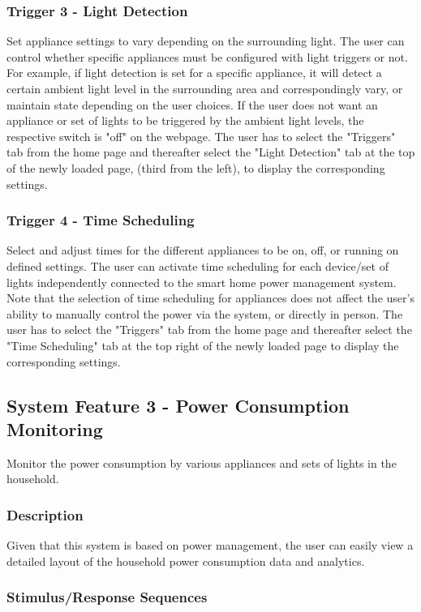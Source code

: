 \documentclass[11pt, a4paper]{article}
\newcounter{subsubsubsection}[subsubsection]
\begin{document}
	\subsubsection{Trigger 3 - Light Detection}
	Set appliance settings to vary depending on the surrounding light.
	The user can control whether specific appliances must be configured with light triggers or not. For example, if light detection is set for a specific appliance, it will detect a certain ambient light level in the surrounding area and correspondingly vary, or maintain state depending on the user choices. If the user does not want an appliance or set of lights to be triggered by the ambient light levels, the respective switch is "off" on the webpage. 
	The user has to select the "Triggers" tab from the home page and thereafter select the "Light Detection" tab at the top of the newly loaded page, (third from the left), to display the corresponding settings.
	\subsubsection{Trigger 4 - Time Scheduling}
	Select and adjust times for the different appliances to be on, off, or running on defined settings. 
	The user can activate time scheduling for each device/set of lights independently connected to the smart home power management system. Note that the selection of time scheduling for appliances does not affect the user's ability to manually control the power via the system, or directly in person. 
	The user has to select the "Triggers" tab from the home page and thereafter select the "Time Scheduling" tab at the top right of the newly loaded page to display the corresponding settings.
	\subsection{System Feature 3 - Power Consumption Monitoring}
	Monitor the power consumption by various appliances and sets of lights in the household. 
	\subsubsection{Description}
	Given that this system is based on power management, the user can easily view a detailed layout of the household power consumption data and analytics. 
	\subsubsection{Stimulus/Response Sequences}
	
\end{document}
